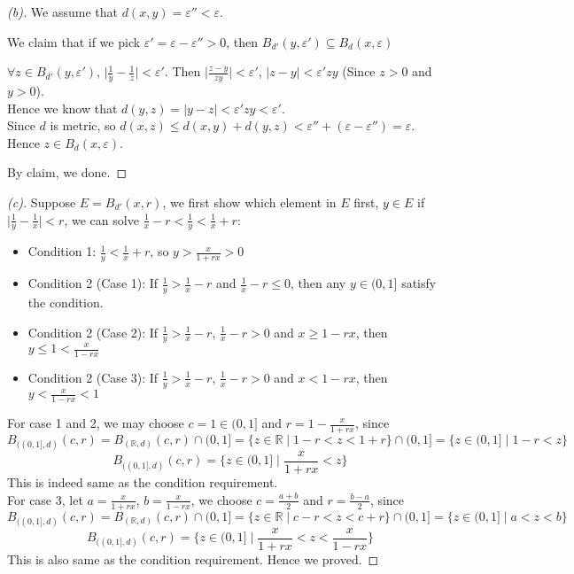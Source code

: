 \begin{proof}[(b)]
    We assume that $d(x,y) = \varepsilon'' < \varepsilon$.
    \begin{claim}
        We claim that if we pick $\varepsilon' = \varepsilon - \varepsilon'' > 0$, then $B_{d'}(y,\varepsilon') \subseteq B_d(x,\varepsilon)$
    \end{claim}
    \begin{explanation}
        $\forall z \in B_{d'}(y, \varepsilon')$, $\lvert \frac{1}{y} - \frac{1}{z} \rvert < \varepsilon'$. Then $\lvert \frac{z-y}{zy} \rvert < \varepsilon'$, $\lvert z-y \rvert < \varepsilon'zy$ (Since $z > 0$ and $y > 0$). \\
        Hence we know that $d(y,z) = \lvert y-z \rvert < \varepsilon'zy < \varepsilon'$. \\
        Since $d$ is metric, so $d(x,z) \leq d(x,y) + d(y,z) < \varepsilon'' + (\varepsilon - \varepsilon'') = \varepsilon$. \\
        Hence $z \in B_d(x, \varepsilon)$.
    \end{explanation}
    By claim, we done.
\end{proof}

\begin{proof}[(c)]
    Suppose $E = B_{d'}(x, r)$, we first show which element in $E$ first, $y \in E$ if $\lvert \frac{1}{y} - \frac{1}{x} \rvert < r$, we can solve $\frac{1}{x} - r < \frac{1}{y} < \frac{1}{x} + r$:
    \begin{itemize}
        \item Condition 1: $\frac{1}{y} < \frac{1}{x} +r$, so $y > \frac{x}{1+rx} > 0$
        \item Condition 2 (Case 1): If $\frac{1}{y} > \frac{1}{x} - r$ and $\frac{1}{x} - r \leq 0$, then any $y \in (0,1]$ satisfy the condition.
        \item Condition 2 (Case 2): If $\frac{1}{y} > \frac{1}{x} - r$, $\frac{1}{x} - r > 0$ and $x \geq 1-rx$, then $y \leq 1 < \frac{x}{1-rx}$
        \item Condition 2 (Case 3): If $\frac{1}{y} > \frac{1}{x} - r$, $\frac{1}{x} - r > 0$ and $x < 1-rx$, then $y < \frac{x}{1-rx} < 1$
    \end{itemize}
    For case 1 and 2, we may choose $c = 1 \in (0,1]$ and $r = 1 - \frac{x}{1+rx}$, since
    \[
    B_{((0,1],d)}(c,r) = B_{(\mathbb{R},d)}(c,r) \cap (0,1] = \{ z \in \mathbb{R} \mid 1-r < z < 1+r \} \cap (0,1] = \{ z \in (0,1] \mid 1-r < z\}
    \]
    \[
    B_{((0,1],d)}(c,r) = \{ z \in (0,1] \mid \frac{x}{1+rx} < z\}
    \]
    This is indeed same as the condition requirement.\\
    For case 3, let $a = \frac{x}{1+rx}$, $b = \frac{x}{1-rx}$, we choose $c = \frac{a+b}{2}$ and $r = \frac{b-a}{2}$, since
    \[
    B_{((0,1],d)}(c,r) = B_{(\mathbb{R},d)}(c,r) \cap (0,1] = \{ z \in \mathbb{R} \mid c-r < z < c+r \} \cap (0,1] = \{ z \in (0,1] \mid a < z < b\}
    \]
    \[
    B_{((0,1],d)}(c,r) = \{ z \in (0,1] \mid \frac{x}{1+rx} < z < \frac{x}{1-rx}\}
    \]
    This is also same as the condition requirement.
    Hence we proved.
    
\end{proof}

